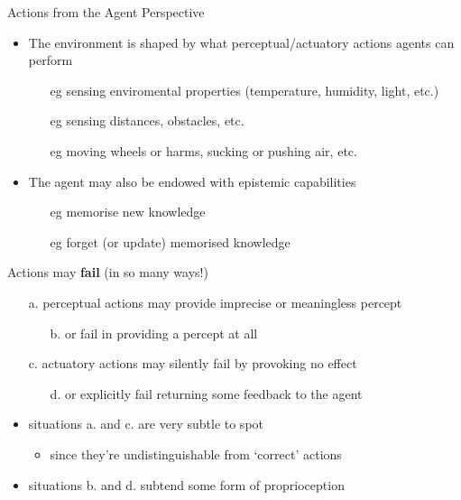 \documentclass[presentation]{beamer}\mode<presentation>{\usetheme{AMSBolognaFC}}
\begin{document}
\begin{frame}[allowframebreaks]{Actions from the Agent Perspective}
    \begin{itemize}
        \item The environment is shaped by what perceptual/actuatory actions agents can perform
        \begin{itemize}
            \item[eg] sensing enviromental properties (temperature, humidity, light, etc.)
            \item[eg] sensing distances, obstacles, etc.
            \item[eg] moving wheels or harms, sucking or pushing air, etc. 
        \end{itemize}

        \vfill

        \item The agent may also be endowed with \alert{epistemic} capabilities
        \begin{itemize}
            \item[eg] memorise new knowledge
            \item[eg] forget (or update) memorised knowledge
        \end{itemize}
    \end{itemize}

    \framebreak

    \begin{alertblock}{Actions may \textbf{fail} (in so many ways!)}
        \begin{itemize}
            \item[a.] perceptual actions may provide \alert{imprecise} or \alert{meaningless} percept
            \begin{itemize}
                \item[b.] or fail in providing a percept at all
            \end{itemize}

            \item[c.] actuatory actions may \alert{silently} fail by \alert{provoking no effect}
            \begin{itemize}
                \item[d.] or explicitly fail returning some feedback to the agent
            \end{itemize}
        \end{itemize}        
    \end{alertblock}
    \begin{itemize}
        \item situations \alert{a.} and \alert{c.} are very subtle to spot
        \begin{itemize}
            \item since they're undistinguishable from `correct' actions
        \end{itemize}

        \item situations \alert{b.} and \alert{d.} subtend some form of \alert{proprioception}
    \end{itemize}
\end{frame}
\end{document}

